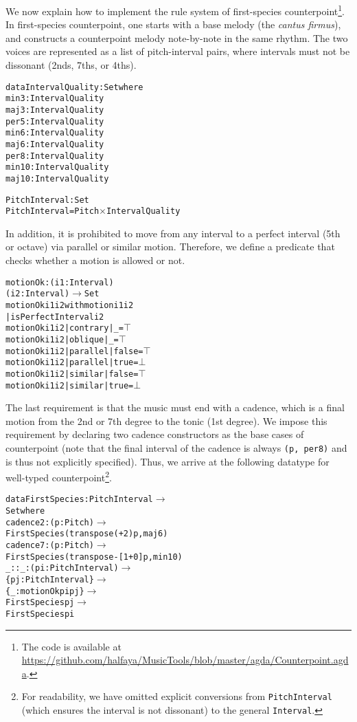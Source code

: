 \documentclass[sigplan,10pt,screen]{acmart}
\begin{document}
We now explain how to implement the rule system of 
first-species counterpoint\footnote{The code is available at \\
\url{https://github.com/halfaya/MusicTools/blob/master/agda/Counterpoint.agda}.}.
In first-species counterpoint, one starts with a base melody 
(the \emph{cantus firmus}), and constructs a counterpoint 
melody note-by-note in the same rhythm.
The two voices are represented as a list of pitch-interval pairs,
where intervals must not be dissonant (2nds, 7ths, or 4ths).

\begin{alltt}
data IntervalQuality : Set where
  min3  : IntervalQuality
  maj3  : IntervalQuality
  per5  : IntervalQuality
  min6  : IntervalQuality
  maj6  : IntervalQuality
  per8  : IntervalQuality
  min10 : IntervalQuality
  maj10 : IntervalQuality

PitchInterval : Set
PitchInterval = Pitch \(\times\) IntervalQuality
\end{alltt}

In addition, it is prohibited to move from any interval to
a perfect interval (5th or octave) via parallel or similar motion.
Therefore, we define a predicate that checks whether a motion 
is allowed or not.

\begin{alltt}
motionOk : (i1 : Interval)
           (i2 : Interval) \(\rightarrow\) Set
motionOk i1 i2 with motion i1 i2
         | isPerfectInterval i2
motionOk i1 i2 | contrary | \_     = \(\top\)
motionOk i1 i2 | oblique  | \_     = \(\top\)
motionOk i1 i2 | parallel | false = \(\top\)
motionOk i1 i2 | parallel | true  = \(\bot\)
motionOk i1 i2 | similar  | false = \(\top\)
motionOk i1 i2 | similar  | true  = \(\bot\)
\end{alltt}

The last requirement is that the music must end with a cadence,
which is a final motion from the 2nd or 7th degree to the tonic 
(1st degree). 
We impose this requirement by declaring two cadence constructors 
as the base cases of counterpoint (note that the final interval of
the cadence is always \texttt{(p, per8)} and is thus not explicitly
specified).
Thus, we arrive at the following datatype for well-typed counterpoint\footnote{
For readability, we have omitted explicit conversions 
from \texttt{PitchInterval} (which ensures the interval is not dissonant) 
to the general \texttt{Interval}.}.

\begin{alltt}
data FirstSpecies : PitchInterval \(\rightarrow\)
                    Set where
  cadence2 : (p : Pitch) \(\rightarrow\)
    FirstSpecies (transpose (+ 2) p , maj6)
  cadence7 : (p : Pitch) \(\rightarrow\)
    FirstSpecies (transpose -[1+ 0 ] p , min10)
  \_::\_ : (pi : PitchInterval) \(\rightarrow\)
         \{pj : PitchInterval\} \(\rightarrow\)
         \{\_ : motionOk pi pj\} \(\rightarrow\)
         FirstSpecies pj \(\rightarrow\)
         FirstSpecies pi
\end{alltt}
\end{document}
